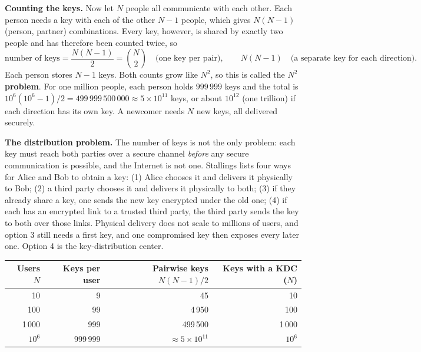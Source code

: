 \textbf{Counting the keys.} Now let $N$ people all communicate with each other. Each person needs a key with each of the other $N - 1$ people, which gives $N(N-1)$ (person, partner) combinations. Every key, however, is shared by exactly two people and has therefore been counted twice, so
\[
\text{number of keys} = \frac{N(N-1)}{2} = \binom{N}{2} \quad\text{(one key per pair)}, \qquad N(N-1) \quad\text{(a separate key for each direction)}.
\]
Each person stores $N - 1$ keys. Both counts grow like $N^2$, so this is called the \textbf{$N^2$ problem}. For one million people, each person holds $999\,999$ keys and the total is $10^6(10^6 - 1)/2 = 499\,999\,500\,000 \approx 5 \times 10^{11}$ keys, or about $10^{12}$ (one trillion) if each direction has its own key. A newcomer needs $N$ new keys, all delivered securely.

\textbf{The distribution problem.} The number of keys is not the only problem: each key must reach both parties over a secure channel \emph{before} any secure communication is possible, and the Internet is not one. Stallings lists four ways for Alice and Bob to obtain a key: (1) Alice chooses it and delivers it physically to Bob; (2) a third party chooses it and delivers it physically to both; (3) if they already share a key, one sends the new key encrypted under the old one; (4) if each has an encrypted link to a trusted third party, the third party sends the key to both over those links. Physical delivery does not scale to millions of users, and option 3 still needs a first key, and one compromised key then exposes every later one. Option 4 is the key-distribution center.

\begin{center}
\end{center}
\begin{center}\small
\begin{tabular}{@{}rrrr@{}}
\toprule
Users $N$ & Keys per user & Pairwise keys $N(N-1)/2$ & Keys with a KDC ($N$)\\
\midrule
10 & 9 & 45 & 10\\
100 & 99 & 4\,950 & 100\\
1\,000 & 999 & 499\,500 & 1\,000\\
$10^6$ & 999\,999 & $\approx 5 \times 10^{11}$ & $10^6$\\
\bottomrule
\end{tabular}
\end{center}

